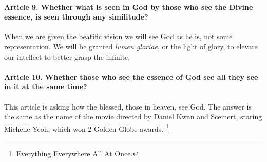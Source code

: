 \documentclass{ucetd}
\begin{document}
\paragraph{Article 9. Whether what is seen in God by those who see the Divine essence, is seen through any similitude?}
When we are given the beatific vision we will see God as he is, not some representation. We will be granted \textit{lumen gloriae}, or the light of glory, to elevate our intellect to better grasp the infinite.

\paragraph{Article 10. Whether those who see the essence of God see all they see in it at the same time?}
This article is asking how the blessed, those in heaven, see God. The answer is the same as the name of the movie directed by Daniel Kwan and Sceinert, staring Michelle Yeoh, which won 2 Golden Globe awards. \footnote{Everything Everywhere All At Once.}
\end{document}
